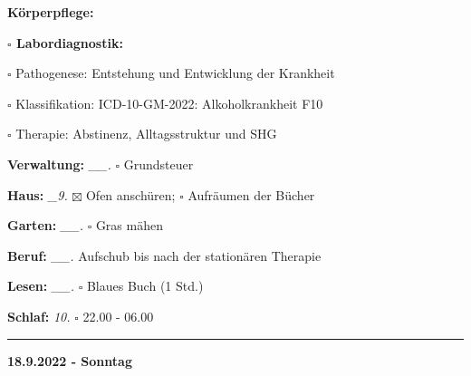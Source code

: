 \documentclass[10pt,a4paper]{article}
\newcommand\prop[1] {{\color {alizarin} {\bf #1}}}             %
\newcommand\rele[1] {{\color {english} \bf {#1}}}              %
\newcommand\mand[1] {{\color {burntorange} {\bf #1}}}          %
\newcommand\ddivide {\vskip -9pt \hrule \vskip 6pt}
\newcommand\bottomspace{\vskip 4pt}
\newcommand\n[1] { {\sl #1.} \hskip 5pt }
\begin{document}
\begin{mdframed}[style=daystyle]
\begin{labeling}{{\mand {Körperpflege:}}}
\begin{minipage}{0.75\textwidth}
\begin{labeling}{{\prop {$\square$ Labordiagnostik:}}}
      \item[$\square$ Pathogenese:]     Entstehung und Entwicklung der Krankheit
      \item[$\square$ Klassifikation:]  ICD-10-GM-2022: Alkoholkrankheit F10
      \item[$\square$ Therapie:]        Abstinenz, Alltagsstruktur und SHG
      \end{labeling}
    \end{minipage}
    \bottomspace
  \item[{\mand {Verwaltung:}}]    \n{\_\_} $\square$ Grundsteuer
  \item[{\mand {Haus:}}]           \n{\_9} $\boxtimes$ Ofen anschüren; $\square$ Aufräumen der Bücher
  \item[{\mand {Garten:}}]        \n{\_\_} $\square$ Gras mähen
  \item[{\mand {Beruf:}}]         \n{\_\_} Aufschub bis nach der stationären Therapie
  \item[{\mand {Lesen:}}]         \n{\_\_} $\square$ Blaues Buch (1 Std.)
  \item[{\mand {Schlaf:}}]          \n{10} $\square$ 22.00 - 06.00
  \end{labeling}
\end{mdframed}


\ddivide
{\rele {18.9.2022 - Sonntag}}
\end{document}
